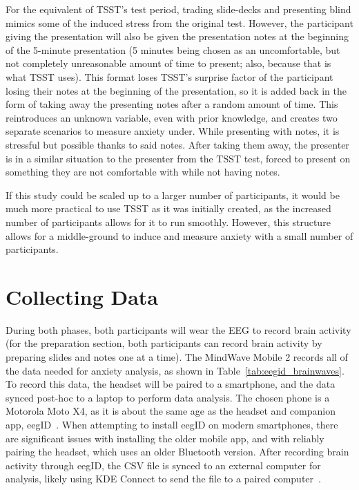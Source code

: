 \documentclass[journal]{IEEEtran}
\begin{document}
For the equivalent of TSST's test period, trading slide-decks and presenting blind mimics some of the induced stress from the original test. However, the participant giving the presentation will also be given the presentation notes at the beginning of the 5-minute presentation (5 minutes being chosen as an uncomfortable, but not completely unreasonable amount of time to present; also, because that is what TSST uses). This format loses TSST's surprise factor of the participant losing their notes at the beginning of the presentation, so it is added back in the form of taking away the presenting notes after a random amount of time. This reintroduces an unknown variable, even with prior knowledge, and creates two separate scenarios to measure anxiety under. While presenting with notes, it is stressful but possible thanks to said notes. After taking them away, the presenter is in a similar situation to the presenter from the TSST test, forced to present on something they are not comfortable with while not having notes.

If this study could be scaled up to a larger number of participants, it would be much more practical to use TSST as it was initially created, as the increased number of participants allows for it to run smoothly. However, this structure allows for a middle-ground to induce and measure anxiety with a small number of participants.

\section{Collecting Data}
During both phases, both participants will wear the EEG to record brain activity (for the preparation section, both participants can record brain activity by preparing slides and notes one at a time). The MindWave Mobile 2 records all of the data needed for anxiety analysis, as shown in Table~\ref{tab:eegid_brainwaves}. To record this data, the headset will be paired to a smartphone, and the data synced post-hoc to a laptop to perform data analysis. The chosen phone is a Motorola Moto X4, as it is about the same age as the headset and companion app, eegID~\cite{gsm_moto_x4_2017,neurosky2026eegid}. When attempting to install eegID on modern smartphones, there are significant issues with installing the older mobile app, and with reliably pairing the headset, which uses an older Bluetooth version. After recording brain activity through eegID, the CSV file is synced to an external computer for analysis, likely using KDE Connect to send the file to a paired computer~\cite{kde_connect_2026}.
\end{document}

